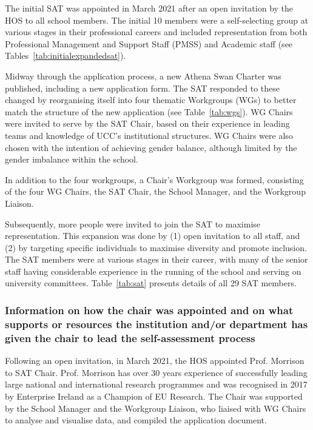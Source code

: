 The initial SAT  was appointed in March 2021 after an open invitation by the \ac{HOS} to all school members.
The initial 10 %
members were a self-selecting group at various stages in their professional careers and included representation from both Professional Management and Support Staff (PMSS) and Academic staff (see Tables~\ref{tab:initialexpandedsat}).





Midway through the application process, a new Athena Swan Charter was published, including a new application form. 
The SAT responded to these changed by reorganising itself into four thematic Workgroups (WGs) to better match the structure of the new application (see Table~\ref{tab:wgs}). WG Chairs were invited to serve by the SAT Chair, based on their experience in leading teams and knowledge of UCC's institutional structures. WG Chairs were also chosen with the intention of achieving gender balance, although limited by the gender imbalance within the school.

In addition to the four workgroups, a Chair's Workgroup was formed, consisting of the four WG Chairs, the SAT Chair, the School Manager, and the Workgroup Liaison.


Subsequently,  more people were invited 
to join the SAT to maximise representation. This expansion was done by (1) open invitation to all staff, 
and (2) by targeting specific individuals to maximise diversity and promote inclusion. 
The SAT members were at various stages in their career, with many of the senior staff having considerable experience in the running of the school and serving on university committees.
Table~\ref{tab:sat} presents details of all 29 SAT members.\\[.1in]


\clearpage 



\subsubsection{Information on how the chair was appointed and on what supports or resources the institution and/or department has given the chair to lead the self-assessment process}

Following an open invitation, in March 2021, 
the \ac{HOS} appointed Prof. Morrison to SAT Chair. Prof. Morrison has over 30 years experience of successfully leading large national and international research programmes and was recognised in 2017 by Enterprise Ireland as a Champion of EU Research. 
The Chair was supported by the School Manager and the Workgroup Liaison, who liaised with WG Chairs to analyse and visualise data, and compiled the application document.



